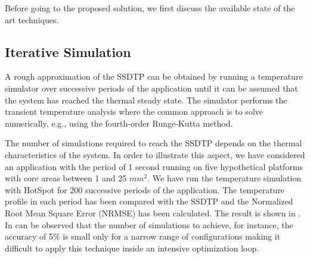 Before going to the proposed solution, we first discuss the available state of the art techniques.

\subsection{Iterative Simulation}
A rough approximation of the SSDTP can be obtained by running a temperature simulator over successive periods of the application until it can be assumed that the system has reached the thermal steady state. The simulator performs the transient temperature analysis where the common approach is to solve  numerically, e.g., using the fourth-order Runge-Kutta method.

The number of simulations required to reach the SSDTP depends on the thermal characteristics of the system. In order to illustrate this aspect, we have considered an application with the period of 1 second running on five hypothetical platforms with core areas between 1 and 25 $mm^2$. We have run the temperature simulation with HotSpot \cite{huang2006} for 200 successive periods of the application. The temperature profile in each period has been compared with the SSDTP and the Normalized Root Mean Square Error (NRMSE) has been calculated. The result is shown in . In can be observed that the number of simulations to achieve, for instance, the accuracy of 5\% is small only for a narrow range of configurations making it difficult to apply this technique inside an intensive optimization loop.

